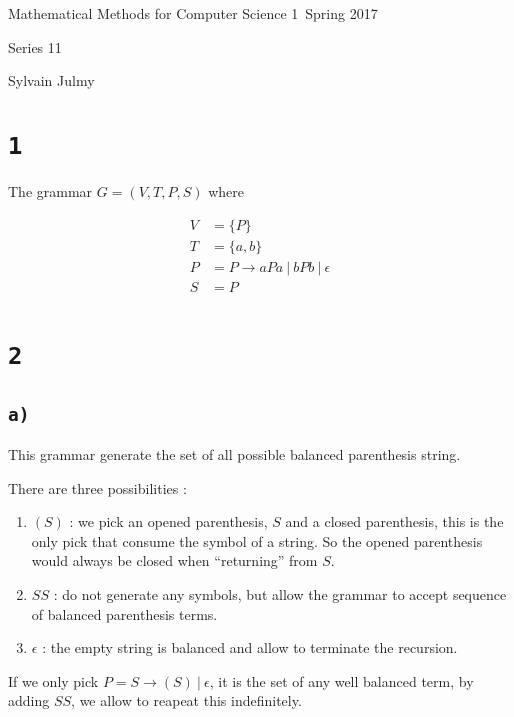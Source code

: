 \documentclass[a4paper,11pt]{report}
\author{Sylvain Julmy}
\date{\today}
\begin{document}
\begin{center}
  \Large{
    Mathematical Methods for Computer Science 1\
    Spring 2017
  }
  \noindent\makebox[\linewidth]{\rule{\linewidth}{0.4pt}}

  Series 11
  \vspace*{1.4cm}

  Sylvain Julmy
  
  \noindent\makebox[\linewidth]{\rule{\linewidth}{0.4pt}}
\end{center}

\section*{\texttt{1}}

The grammar $G = (V,T,P,S)$ where

\begin{align*}
  V &= \{P\}\\
  T &= \{a,b\} \\
  P &= P \rightarrow a P a\ |\ b P b\ |\ \epsilon \\
  S &= P \\
\end{align*}

\section*{\texttt{2}}

\subsection*{\texttt{a)}}

This grammar generate the set of all possible balanced parenthesis string.

There are three possibilities :

\begin{enumerate}
\item $(S)$ : we pick an opened parenthesis, $S$ and a closed parenthesis, this
  is the only pick that consume the symbol of a string. So the opened
  parenthesis would always be closed when ``returning'' from $S$.
\item $SS$ : do not generate any symbols, but allow the grammar to accept
  sequence of balanced parenthesis terms.
\item $\epsilon$ : the empty string is balanced and allow to terminate the recursion.
\end{enumerate}

If we only pick $P = S \to (S)\ |\ \epsilon$, it is the set of any well balanced
term, by adding $SS$, we allow to reapeat this indefinitely.
\end{document}
